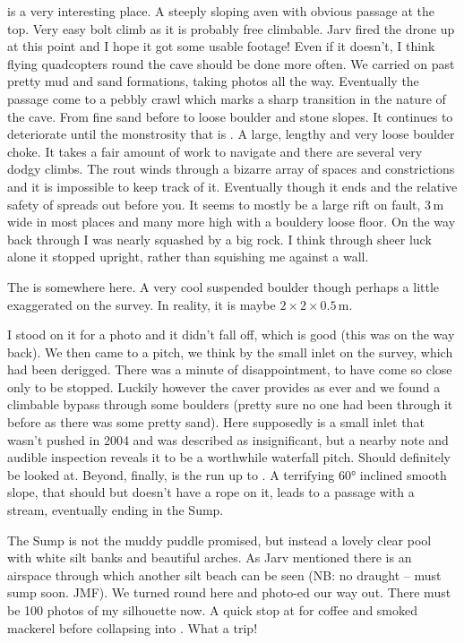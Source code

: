  is a very interesting place. A steeply sloping aven with obvious passage at the top. Very easy bolt climb as it is probably free climbable. Jarv fired the drone up at this point and I hope it got some usable footage! Even if it doesn't,  I think flying quadcopters round the cave should be done more often.
We carried on past pretty mud  and sand formations, taking photos all the way. Eventually the passage come to a pebbly crawl which marks a sharp transition in the nature of the cave.  From fine sand before to loose boulder and stone slopes. It continues to deteriorate until the monstrosity that is . A large, lengthy and very loose boulder choke. 
It takes a fair amount of work to navigate and there are several very dodgy climbs. The rout winds through a bizarre array of spaces and constrictions and it is impossible to keep track of it.
Eventually though it ends and the relative safety of  spreads out before you. It seems to mostly be a large rift on fault, 3\,m wide in most places and many more high with a bouldery loose floor. On the way back through I was nearly squashed by a big rock. I think through sheer luck alone it stopped upright, rather than squishing me against a wall. 

The  is somewhere here. A very cool suspended boulder though perhaps a little exaggerated on the survey. In reality, it is maybe $2\times2\times0.5$\,m.

I stood on it for a photo and it didn't fall off, which is good (this was on the way back).
We then came to  a pitch, we think by the small inlet on the survey, which had been derigged. There was a minute of disappointment, to have come so close only to be stopped. Luckily however the caver provides as ever and we found a climbable bypass through some boulders (pretty sure no one had been through it before as there was some pretty sand).
Here supposedly is a small inlet that wasn't pushed in 2004 and was described as insignificant, but a nearby note and audible inspection reveals it to be a worthwhile waterfall pitch. Should definitely be looked at.
Beyond, finally, is the run up to . A terrifying 60° inclined smooth slope, that should but doesn't have a rope on it,  leads to a passage with a stream, eventually ending in the Sump. 

The Sump is not the muddy puddle promised, but instead a lovely clear pool with white silt banks and beautiful arches. As Jarv mentioned there is an airspace through which another silt beach can be seen (NB: no draught – must sump soon. JMF). 
We turned round here and photo-ed our way out. There must be 100 photos of my silhouette now. A quick stop at  for coffee and smoked mackerel before collapsing into . 
What a trip!

\begin{figure}[t!]
\checkoddpage \ifoddpage \forcerectofloat \else \forceversofloat \fi

\end{figure}
